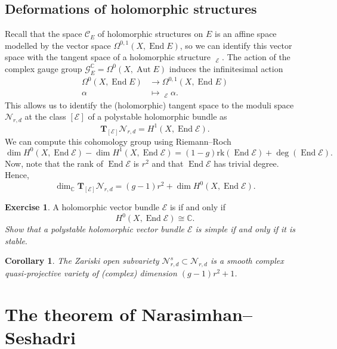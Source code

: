 \documentclass[12pt,a4paper]{amsbook}
\newtheorem{corol}[thm]{Corollary}
\theoremstyle{remark} \newtheorem{rmk}[thm]{Remark}
\theoremstyle{definition} \newtheorem{defn}[thm]{Definition}
\theoremstyle{definition} \newtheorem{ex}[thm]{Example}
\theoremstyle{definition} \newtheorem{ej}{Exercise}
\let\emph\relax
\newcommand{\C}{\mathbb C}
\newcommand{\cC}{\mathcal C}
\newcommand{\cG}{\mathcal G}
\newcommand{\cN}{\mathcal N}
\newcommand{\sE}{\mathscr E}
\DeclareMathOperator{\Aut}{Aut}
\DeclareMathOperator{\End}{End}
\DeclareMathOperator{\delbar}{\bar{\partial}}
\begin{document}
\subsection*{Deformations of holomorphic structures}
Recall that the space $\cC_E$ of holomorphic structures on $E$ is an affine space modelled by the vector space $\Omega^{0,1}(X,\End E)$, so we can identify this vector space with the tangent space of a holomorphic structure $\delbar_{\sE}$. The action of the complex gauge group $\cG_E^\C=\Omega^0(X,\Aut E)$ induces the infinitesimal action
\begin{align*}
  \Omega^0(X,\End E) & \longrightarrow \Omega^{0,1}(X,\End E)  \\
  \alpha  & \longmapsto \delbar_{\sE} \alpha.
\end{align*}
This allows us to identify the (holomorphic) tangent space to the moduli space $\cN_{r,d}$ at the class $[\sE]$ of a polystable holomorphic bundle as
\begin{equation*}
\bm{T}_{[\sE]} \cN_{r,d} = H^1(X, \End \sE).
\end{equation*}
We can compute this cohomology group using Riemann--Roch
\begin{equation*}
\dim H^0(X,\End \sE)- \dim H^1(X,\End \sE) = (1-g)\mathrm{rk}(\End \sE) + \deg (\End \sE).
\end{equation*}
Now, note that the rank of $\End \sE$ is $r^2$ and that $\End \sE$ has trivial degree. Hence,
\begin{equation*}
\dim_{\C} \bm{T}_{[\sE]} \cN_{r,d} = (g-1)r^2 + \dim H^0(X,\End \sE).
\end{equation*}

\begin{ej} \label{ej:stablesimple}
A holomorphic vector bundle $\sE$ is \emph{simple} if and only if \[H^0(X,\End \sE)\cong \C.\] \textit{Show that a polystable holomorphic vector bundle $\sE$ is simple if and only if it is stable}.
\end{ej}

\begin{corol}
The Zariski open subvariety $\cN^s_{r,d}\subset \cN_{r,d}$ is a smooth complex quasi-projective variety of (complex) dimension $(g-1)r^2+1$.
\end{corol}

\section{The theorem of Narasimhan--Seshadri} \label{ss:Narasimhan-Seshadri}
\end{document}
